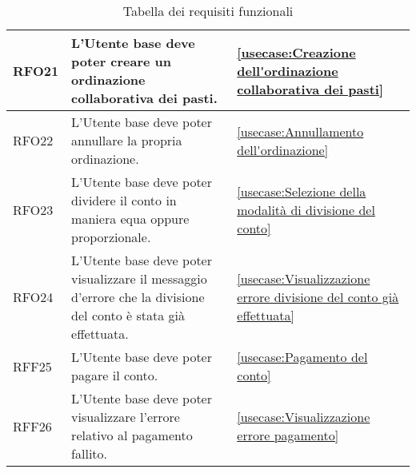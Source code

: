\begin{table}[H]
\begin{tabularx}{\textwidth}{l|X|p{2cm}}
		\hline
		RFO21       & L'Utente base deve poter creare un ordinazione collaborativa dei pasti.                                        & \autoref{usecase:Creazione dell'ordinazione collaborativa dei pasti}                                               \\
		\hline
		RFO22       & L'Utente base deve poter annullare la propria ordinazione.                                                     & \autoref{usecase:Annullamento dell'ordinazione}                                                                    \\
		\hline
		RFO23       & L'Utente base deve poter dividere il conto in maniera equa oppure proporzionale.                               & \autoref{usecase:Selezione della modalità di divisione del conto}                                                  \\
		\hline
		RFO24       & L'Utente base deve poter visualizzare il messaggio d'errore che la divisione del conto è stata già effettuata. & \autoref{usecase:Visualizzazione errore divisione del conto già effettuata}                                        \\
		\hline
		RFF25       & L'Utente base deve poter pagare il conto.                                                                      & \autoref{usecase:Pagamento del conto}                                                                              \\
		\hline
		RFF26       & L'Utente base deve poter visualizzare l'errore relativo al pagamento fallito.                                  & \autoref{usecase:Visualizzazione errore pagamento}                                                                 \\
	\end{tabularx}
	\caption{Tabella dei requisiti funzionali}
\end{table}


